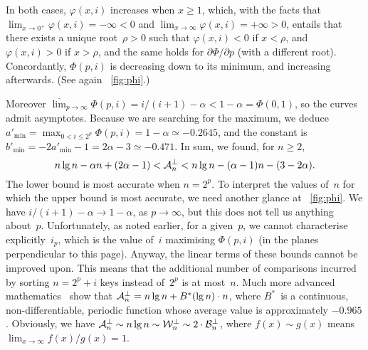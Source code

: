 In both cases, \(\varphi(x,i)\) increases when \(x \geqslant 1\),
which, with the facts that \(\lim_{x\to 0^{+}}\varphi(x,i) = -\infty <
0\) and \(\lim_{x\to\infty}\varphi(x,i) = +\infty > 0\), entails that
there exists a unique root~\(\rho > 0\) such that \(\varphi(x,i) < 0\)
if \(x < \rho\), and \(\varphi(x,i) > 0\) if \(x > \rho\), and the
same holds for \(\partial\Phi/\partial p\) (with a different
root). Concordantly, \(\Phi(p,i)\) is decreasing down to its minimum,
and increasing afterwards. (See again \fig~\ref{fig:phi}.)

Moreover \(\overline\lim_{p \to \infty}\Phi(p,i) = i/(i+1) - \alpha <
1 - \alpha = \Phi(0,1)\), so the curves admit asymptotes. Because we
are searching for the maximum, we deduce \(a'_{\min} = \max_{0 < i
  \leqslant 2^p}\Phi(p,i) = 1 - \alpha \simeq -0.2645\), and the
constant is \(b'_{\min} = -2a'_{\min} - 1 = 2\alpha - 3 \simeq
-0.471\). In sum, we found, for \(n \geqslant 2\),
\begin{equation}
n\lg n - \alpha n + (2\alpha - 1) < \mathcal{A}_{n}^{\bot} 
< n\lg n - (\alpha - 1)n - (3 - 2\alpha).
\label{ineq:bounds_Mbms}
\end{equation}
The lower bound is most accurate when \(n=2^p\). To interpret the
values of~\(n\) for which the upper bound is most accurate, we need
another glance at \fig~\ref{fig:phi}. We have \(i/(i+1) - \alpha \to 1
- \alpha\), as \(p \to \infty\), but this does not tell us anything
about~\(p\). Unfortunately, as noted earlier, for a given~\(p\), we
cannot characterise explicitly~\(i_p\), which is the value of~\(i\)
maximising \(\Phi(p,i)\) (in the planes perpendicular to this
page). Anyway, the linear terms of these bounds cannot be improved
upon. This means that the additional number of comparisons incurred by
sorting \(n=2^p+i\) keys instead of~\(2^p\) is at most~\(n\). Much
more advanced mathematics~\cite{PannyProdinger:1995} show that
\(\mathcal{A}_{n}^{\bot} = n\lg n + B^*(\lg n) \cdot n\), where \(B^*\)~is a
continuous, non-differentiable, periodic function whose average
value is approximately \(-0.965\). Obviously, we have \(\mathcal{A}_{n}^{\bot}
\sim n\lg n \sim \mathcal{W}_{n}^{\bot} \sim 2 \cdot \mathcal{B}_{n}^{\bot}\), where \(f(x)
\sim g(x)\) means \(\lim_{x\to \infty}f(x)/g(x) = 1\).

